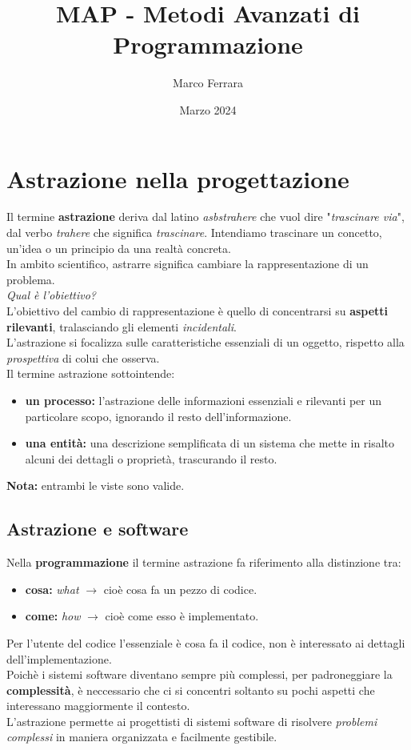 \documentclass{article}
\title{MAP - Metodi Avanzati di Programmazione}
\author{Marco Ferrara}
\date{Marzo 2024}
\begin{document}
	\maketitle
	
	\tableofcontents
	\newpage
	
	\section{Astrazione nella progettazione}
	Il termine \textbf{astrazione} deriva dal latino \textit{asbstrahere} che vuol dire "\textit{trascinare via}", dal verbo \textit{trahere} che significa \textit{trascinare}. Intendiamo trascinare un concetto, un'idea o un principio da una realtà concreta. \\
	In ambito scientifico, astrarre significa cambiare la rappresentazione di un problema.\\
	\textit{Qual è l'obiettivo?}\\
	L'obiettivo del cambio di rappresentazione è quello di concentrarsi su \textbf{aspetti rilevanti}, tralasciando gli elementi \textit{incidentali}.
	\vspace{\baselineskip} \\
	L'astrazione si focalizza sulle caratteristiche essenziali di un oggetto, rispetto alla \textit{prospettiva} di colui che osserva.
	\vspace{\baselineskip} \\
	Il termine astrazione sottointende:
	\begin{itemize}
		\item \textbf{un processo:} l'astrazione delle informazioni essenziali e rilevanti per un particolare scopo, ignorando il resto dell'informazione.
		\item \textbf{una entità:} una descrizione semplificata di un sistema che mette in risalto alcuni dei dettagli o proprietà, trascurando il resto.
	\end{itemize}
	\textbf{Nota:} entrambi le viste sono valide.
	
	\subsection{Astrazione e software}
	Nella \textbf{programmazione} il termine astrazione fa riferimento alla distinzione tra:
	\begin{itemize}
		\item \textbf{cosa:} \textit{what} $\rightarrow$ cioè cosa fa un pezzo di codice.
		\item \textbf{come:} \textit{how} $\rightarrow$ cioè come esso è implementato. 
	\end{itemize}	
	Per l'utente del codice l'essenziale è cosa fa il codice, non è interessato ai dettagli dell'implementazione.
	\vspace{\baselineskip}\\
	Poichè i sistemi software diventano sempre più complessi, per padroneggiare la \textbf{complessità}, è neccessario che ci si concentri soltanto su pochi aspetti che interessano maggiormente il contesto.\\
	L'astrazione permette ai progettisti di sistemi software di risolvere \textit{problemi complessi} in maniera organizzata e facilmente gestibile.
	
\end{document}
